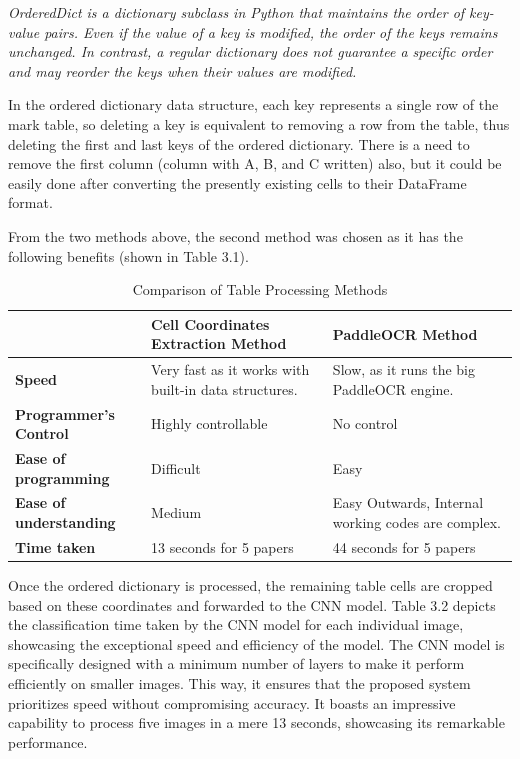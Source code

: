 \vspace{1mm}

\noindent \textit{OrderedDict is a dictionary subclass in Python that maintains the order of key-value pairs. Even if the value of a key is modified, the order of the keys remains unchanged. In contrast, a regular dictionary does not guarantee a specific order and may reorder the keys when their values are modified.}

\vspace{0.5mm}

\noindent In the ordered dictionary data structure, each key represents a single row of the mark table, so deleting a key is equivalent to removing a row from the table, thus deleting the first and last keys of the ordered dictionary. There is a  need to remove the first column (column with A, B, and C written) also, but it could be easily done after converting the presently existing cells to their DataFrame format.

\noindent From the two methods above, the second method was chosen as it has the following benefits (shown in Table 3.1).

\begin{table}[h!]
  \centering
  \renewcommand{\arraystretch}{1.2}
  \begin{tabular}{|l|p{4.5cm}|p{4.5cm}|}
      \hline
      \textbf{ } & \textbf{Cell Coordinates Extraction Method} & \textbf{PaddleOCR Method} \\
      \hline
      \textbf{Speed} & Very fast as it works with built-in data structures. & Slow, as it runs the big PaddleOCR engine. \\
      \hline
      \textbf{Programmer's Control} & Highly controllable & No control \\
      \hline
      \textbf{Ease of programming} & Difficult & Easy \\
      \hline
      \textbf{Ease of understanding} & Medium & Easy Outwards, Internal working codes are complex.\\
      \hline
      \textbf{Time taken} & 13 seconds for 5 papers & 44 seconds for 5 papers \\
      \hline
  \end{tabular}
  \caption{Comparison of Table Processing Methods}
\end{table}

\clearpage

\noindent Once the ordered dictionary is processed, the remaining table cells are cropped based on these coordinates and forwarded to the CNN model. Table 3.2 depicts the classification time taken by the CNN model for each individual image, showcasing the exceptional speed and efficiency of the model. The CNN model is specifically designed with a minimum number of layers to make it perform efficiently on smaller images. This way, it ensures that the proposed system prioritizes speed without compromising accuracy. It boasts an impressive capability to process five images in a mere 13 seconds, showcasing its remarkable performance.

